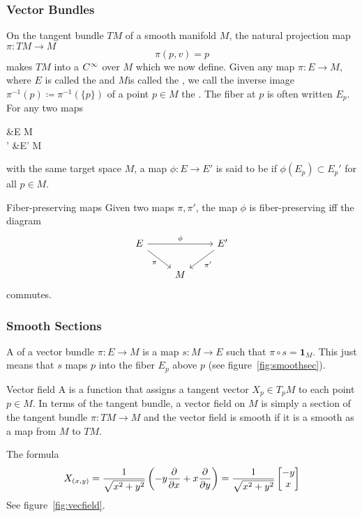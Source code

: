 \subsubsection{Vector Bundles}

On the tangent bundle \(TM\) of a smooth manifold \(M\), the natural projection map \(\pi \colon TM \rightarrow M\)
\[
    \pi(p, v)= p     
\]
makes \(TM\) into a \(C^\infty\)  over \(M\) which we now define. 
Given any map \(\pi \colon E \rightarrow M\), where \(E\) is called the  and \(M\)is called the , we call the inverse image \(\pi^{-1}(p) \coloneqq \pi^{-1}(\{p\})\) of a point \(p \in M\) the .
The fiber at \(p\) is often written \(E_p\).
For any two maps 
\begin{splitenv}
    \pi &\colon E \rightarrow M  \\ 
    \pi' &\colon E' \rightarrow M 
\end{splitenv}
with the same target space \(M\), a map \(\phi \colon E \rightarrow E'\) is said to be  if \(\phi(E_p) \subset E_{p}'\) for all \(p \in M\).
\begin{example}{Fiber-preserving maps}{}
    Given two maps \(\pi, \pi'\), the map \(\phi\) is fiber-preserving iff the diagram
    \[
        \begin{tikzcd}
            E \arrow[swap]{rd}{\pi}\arrow{rr}{\phi} & & E' \arrow{ld}{\pi'} \\
            & M &
        \end{tikzcd}
    \]
    commutes.
\end{example}

\subsubsection{Smooth Sections}

A  of a vector bundle \(\pi \colon E \rightarrow M\) is a map \(s \colon M \rightarrow E\) such that \(\pi \circ s = \mathbf{1}_M\).
This just means that \(s\) maps \(p\) into the fiber \(E_p\) above \(p\) (see figure~\ref{fig:smoothsec}).

\begin{definition}{Vector field}{}
    A  is a function that assigns a tangent vector \(X_p \in T_p M\) to each point \(p \in M\). In terms of the tangent bundle, a vector field on \(M\) is simply a section of the tangent bundle \(\pi \colon TM \rightarrow M\) and the vector field is smooth if it is a smooth as a map from \(M\) to \(TM\).
\end{definition}
\begin{example}{}{}
    The formula
    \[
        X_{(x,y)} = \frac{1}{\sqrt{x^2+y^2}} \left( -y \pdv{x} + x \pdv{y} \right)  = \frac{1}{\sqrt{x^2+y^2}} \begin{bmatrix}
            -y \\ x
        \end{bmatrix}    
    \] 
    See figure~\ref{fig:vecfield}.
\end{example}

